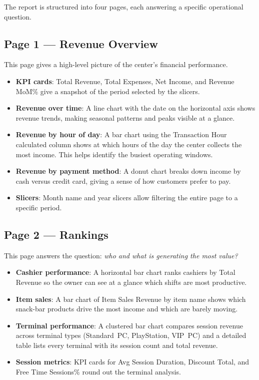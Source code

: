 The report is structured into four pages, each answering a specific operational
question.

\subsection{Page 1 — Revenue Overview}

This page gives a high-level picture of the center's financial performance.

\begin{itemize}
  \item \textbf{KPI cards}: Total Revenue, Total Expenses, Net Income, and
        Revenue MoM\% give a snapshot of the period selected by the slicers.
  \item \textbf{Revenue over time}: A line chart with the date on the horizontal
        axis shows revenue trends, making seasonal patterns and peaks visible
        at a glance.
  \item \textbf{Revenue by hour of day}: A bar chart using the Transaction Hour
        calculated column shows at which hours of the day the center collects the
        most income. This helps identify the busiest operating windows.
  \item \textbf{Revenue by payment method}: A donut chart breaks down income by
        cash versus credit card, giving a sense of how customers prefer to pay.
  \item \textbf{Slicers}: Month name and year slicers allow filtering the entire
        page to a specific period.
\end{itemize}

\subsection{Page 2 — Rankings}

This page answers the question: \textit{who and what is generating the most value?}

\begin{itemize}
  \item \textbf{Cashier performance}: A horizontal bar chart ranks cashiers by
        Total Revenue so the owner can see at a glance which shifts are most
        productive.
  \item \textbf{Item sales}: A bar chart of Item Sales Revenue by item name shows
        which snack-bar products drive the most income and which are barely moving.
  \item \textbf{Terminal performance}: A clustered bar chart compares session revenue
        across terminal types (Standard~PC, PlayStation, VIP~PC) and a detailed
        table lists every terminal with its session count and total revenue.
  \item \textbf{Session metrics}: KPI cards for Avg Session Duration, Discount Total,
        and Free Time Sessions\% round out the terminal analysis.
\end{itemize}

